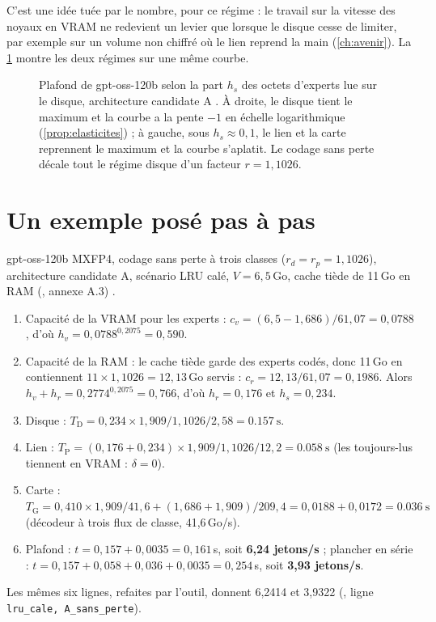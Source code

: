 C'est une idée tuée par le nombre, pour ce régime : le travail sur la vitesse des noyaux en VRAM ne redevient un levier que lorsque le disque cesse de limiter, par exemple sur un volume non chiffré où le lien reprend la main (\cref{ch:avenir}). La \cref{fig:plafond-hs} montre les deux régimes sur une même courbe.

\begin{figure}[ht]
\centering
\GraphePlafondHs
\caption[Le plafond selon la part lue du disque]{Plafond de gpt-oss-120b selon la part $h_s$ des octets d'experts lue sur le disque, architecture candidate A \calc. À droite, le disque tient le maximum et la courbe a la pente $-1$ en échelle logarithmique (\cref{prop:elasticites}) ; à gauche, sous $h_s \approx 0{,}1$, le lien et la carte reprennent le maximum et la courbe s'aplatit. Le codage sans perte décale tout le régime disque d'un facteur $r = 1{,}1026$.}
\label{fig:plafond-hs}
\end{figure}

\section{Un exemple posé pas à pas}\label{sec:exemple-pose}

gpt-oss-120b MXFP4, codage sans perte à trois classes ($r_d = r_p = 1{,}1026$), architecture candidate A, scénario LRU calé, $V = 6{,}5$\,Go, cache tiède de 11\,Go en RAM (, annexe A.3) \calc.
\begin{enumerate}
\item Capacité de la VRAM pour les experts : $c_v = (6{,}5 - 1{,}686)/61{,}07 = 0{,}0788$, d'où $h_v = 0{,}0788^{0{,}2075} = 0{,}590$.
\item Capacité de la RAM : le cache tiède garde des experts codés, donc 11\,Go en contiennent $11 \times 1{,}1026 = 12{,}13$\,Go servis : $c_r = 12{,}13/61{,}07 = 0{,}1986$. Alors $h_v + h_r = 0{,}2774^{0{,}2075} = 0{,}766$, d'où $h_r = 0{,}176$ et $h_s = 0{,}234$.
\item Disque : $T_{\mathrm{D}} = 0{,}234 \times 1{,}909 / 1{,}1026 / 2{,}58 = \SI{0.157}{\second}$.
\item Lien : $T_{\mathrm{P}} = (0{,}176 + 0{,}234) \times 1{,}909 / 1{,}1026 / 12{,}2 = \SI{0.058}{\second}$ (les toujours-lus tiennent en VRAM : $\delta = 0$).
\item Carte : $T_{\mathrm{G}} = 0{,}410 \times 1{,}909 / 41{,}6 + (1{,}686 + 1{,}909)/209{,}4 = 0{,}0188 + 0{,}0172 = \SI{0.036}{\second}$ (décodeur à trois flux de classe, 41,6\,Go/s).
\item Plafond : $t = 0{,}157 + 0{,}0035 = 0{,}161$\,s, soit \textbf{6,24 jetons/s} ; plancher en série : $t = 0{,}157 + 0{,}058 + 0{,}036 + 0{,}0035 = 0{,}254$\,s, soit \textbf{3,93 jetons/s}.
\end{enumerate}
Les mêmes six lignes, refaites par l'outil, donnent 6,2414 et 3,9322 (, ligne \texttt{lru\_cale, A\_sans\_perte}).

